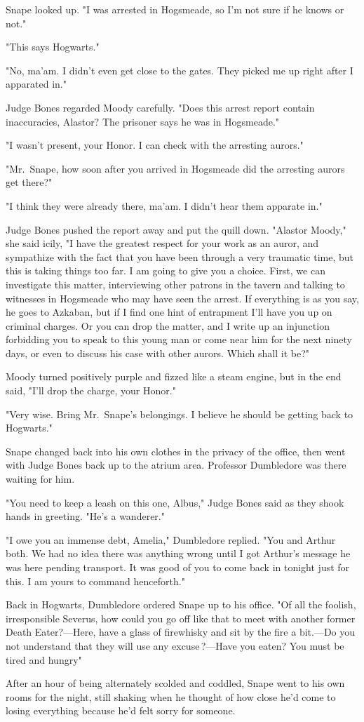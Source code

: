 Snape looked up. "I was arrested in Hogsmeade, so I'm not sure if he knows or not."

"This says Hogwarts."

"No, ma'am. I didn't even get close to the gates. They picked me up right after I apparated in."

Judge Bones regarded Moody carefully. "Does this arrest report contain inaccuracies, Alastor? The prisoner says he was in Hogsmeade."

"I wasn't present, your Honor. I can check with the arresting aurors."

"Mr.~Snape, how soon after you arrived in Hogsmeade did the arresting aurors get there?"

"I think they were already there, ma'am. I didn't hear them apparate in."

Judge Bones pushed the report away and put the quill down. "Alastor Moody," she said icily, "I have the greatest respect for your work as an auror, and sympathize with the fact that you have been through a very traumatic time, but this is taking things too far. I am going to give you a choice. First, we can investigate this matter, interviewing other patrons in the tavern and talking to witnesses in Hogsmeade who may have seen the arrest. If everything is as you say, he goes to Azkaban, but if I find one hint of entrapment I'll have you up on criminal charges. Or you can drop the matter, and I write up an injunction forbidding you to speak to this young man or come near him for the next ninety days, or even to discuss his case with other aurors. Which shall it be?"

Moody turned positively purple and fizzed like a steam engine, but in the end said, "I'll drop the charge, your Honor."

"Very wise. Bring Mr.~Snape's belongings. I believe he should be getting back to Hogwarts."

Snape changed back into his own clothes in the privacy of the office, then went with Judge Bones back up to the atrium area. Professor Dumbledore was there waiting for him.

"You need to keep a leash on this one, Albus," Judge Bones said as they shook hands in greeting. "He's a wanderer."

"I owe you an immense debt, Amelia," Dumbledore replied. "You and Arthur both. We had no idea there was anything wrong until I got Arthur's message he was here pending transport. It was good of you to come back in tonight just for this. I am yours to command henceforth."

Back in Hogwarts, Dumbledore ordered Snape up to his office. "Of all the foolish, irresponsible{\el} Severus, how could you go off like that to meet with another former Death Eater?—Here, have a glass of firewhisky and sit by the fire a bit.—Do you not understand that they will use any excuse{\el}\,?—Have you eaten? You must be tired and hungry{\el}"

After an hour of being alternately scolded and coddled, Snape went to his own rooms for the night, still shaking when he thought of how close he'd come to losing everything because he'd felt sorry for someone. 


